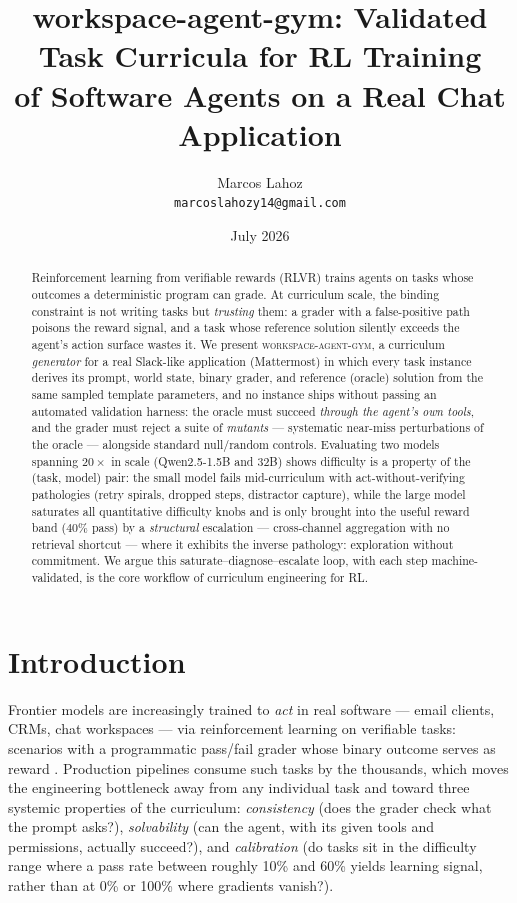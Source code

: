 \documentclass[10pt]{article}
\title{\textbf{workspace-agent-gym: Validated Task Curricula for RL Training\\of Software Agents on a Real Chat Application}}
\author{Marcos Lahoz\\\texttt{marcoslahozy14@gmail.com}}
\date{July 2026}
\begin{document}
\maketitle

\begin{abstract}
Reinforcement learning from verifiable rewards (RLVR) trains agents on tasks whose outcomes a deterministic program can grade. At curriculum scale, the binding constraint is not writing tasks but \emph{trusting} them: a grader with a false-positive path poisons the reward signal, and a task whose reference solution silently exceeds the agent's action surface wastes it. We present \textsc{workspace-agent-gym}, a curriculum \emph{generator} for a real Slack-like application (Mattermost) in which every task instance derives its prompt, world state, binary grader, and reference (oracle) solution from the same sampled template parameters, and no instance ships without passing an automated validation harness: the oracle must succeed \emph{through the agent's own tools}, and the grader must reject a suite of \emph{mutants} --- systematic near-miss perturbations of the oracle --- alongside standard null/random controls. Evaluating two models spanning $20\times$ in scale (Qwen2.5-1.5B and 32B) shows difficulty is a property of the (task, model) pair: the small model fails mid-curriculum with act-without-verifying pathologies (retry spirals, dropped steps, distractor capture), while the large model saturates all quantitative difficulty knobs and is only brought into the useful reward band ($40\%$ pass) by a \emph{structural} escalation --- cross-channel aggregation with no retrieval shortcut --- where it exhibits the inverse pathology: exploration without commitment. We argue this saturate--diagnose--escalate loop, with each step machine-validated, is the core workflow of curriculum engineering for RL.
\end{abstract}

\section{Introduction}

Frontier models are increasingly trained to \emph{act} in real software --- email clients, CRMs, chat workspaces --- via reinforcement learning on verifiable tasks: scenarios with a programmatic pass/fail grader whose binary outcome serves as reward \cite{yao2024tau, tac2024}. Production pipelines consume such tasks by the thousands, which moves the engineering bottleneck away from any individual task and toward three systemic properties of the curriculum: \emph{consistency} (does the grader check what the prompt asks?), \emph{solvability} (can the agent, with its given tools and permissions, actually succeed?), and \emph{calibration} (do tasks sit in the difficulty range where a pass rate between roughly 10\% and 60\% yields learning signal, rather than at 0\% or 100\% where gradients vanish?).
\end{document}
